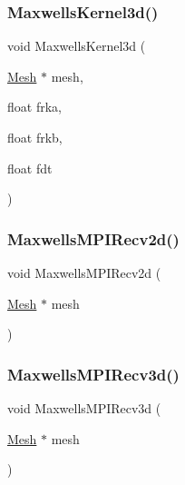 \mbox{\label{a00554_aebe732d2b2c755a4892e1eacb6a2b2a7}} 
\subsubsection{\texorpdfstring{Maxwells\+Kernel3d()}{MaxwellsKernel3d()}}
{\footnotesize\ttfamily void Maxwells\+Kernel3d (\begin{DoxyParamCaption}\item[{\hyperlink{a00557_aeffbe0891ab73a4d8964c9cb7978426e}{Mesh} $\ast$}]{mesh,  }\item[{float}]{frka,  }\item[{float}]{frkb,  }\item[{float}]{fdt }\end{DoxyParamCaption})}

\mbox{\label{a00554_a53811ddf1e649d3fec43d10bdf1257d1}} 
\subsubsection{\texorpdfstring{Maxwells\+M\+P\+I\+Recv2d()}{MaxwellsMPIRecv2d()}}
{\footnotesize\ttfamily void Maxwells\+M\+P\+I\+Recv2d (\begin{DoxyParamCaption}\item[{\hyperlink{a00557_aeffbe0891ab73a4d8964c9cb7978426e}{Mesh} $\ast$}]{mesh }\end{DoxyParamCaption})}

\mbox{\label{a00554_a58d69c52413e160a4ebf893be8168162}} 
\subsubsection{\texorpdfstring{Maxwells\+M\+P\+I\+Recv3d()}{MaxwellsMPIRecv3d()}}
{\footnotesize\ttfamily void Maxwells\+M\+P\+I\+Recv3d (\begin{DoxyParamCaption}\item[{\hyperlink{a00557_aeffbe0891ab73a4d8964c9cb7978426e}{Mesh} $\ast$}]{mesh }\end{DoxyParamCaption})}


